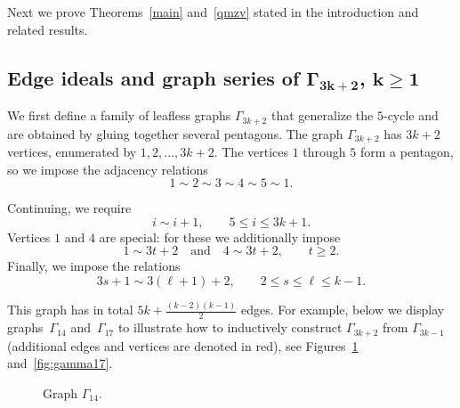 \documentclass[pdftex]{sigma}
\numberwithin{equation}{section}
\theoremstyle{definition}
\begin{document}
Next we prove Theorems~\ref{main} and~\ref{qmzv} stated in the introduction and related results.

\subsection[Edge ideals and graph series of Gamma\_\{3k+2\}, k>=1]{Edge ideals and graph series of $\boldsymbol{\Gamma_{3k+2}}$, $\boldsymbol{k \geq 1}$}\label{section2.2}

We first define a family of leafless graphs $\Gamma_{3k+2}$ that generalize the $5$-cycle and are obtained by gluing together several pentagons. The graph $\Gamma_{3k+2}$ has $3k+2$ vertices, enumerated by $1,2,\dots,3k+2$. The vertices $1$ through $5$ form a pentagon, so we impose the adjacency relations
\[
1 \sim 2 \sim 3 \sim 4 \sim 5 \sim 1.
\]

Continuing, we require
\[
i \sim i+1, \qquad 5 \leq i \leq 3k+1.
\]
Vertices $1$ and $4$ are special: for these we additionally impose
\[
1 \sim 3t+2 \quad \text{and} \quad 4 \sim 3t+2, \qquad t \geq 2.
\]
Finally, we impose the relations
\[
3s+1 \sim 3(\ell+1)+2, \qquad 2 \leq s \leq \ell \leq k-1.
\]

This graph has in total $5k+\frac{(k-2)(k-1)}{2}$ edges.
For example, below we display graphs~$\Gamma_{14}$ and~$\Gamma_{17}$ to illustrate how to inductively construct $\Gamma_{3k+2}$ from $\Gamma_{3k-1}$ (additional edges and vertices are denoted in red), see Figures~\ref{fig:gamma14} and~\ref{fig:gamma17}.

\begin{figure}[!ht]\centering\vspace{-4mm}
\vspace{-4mm}

\caption{Graph $\Gamma_{14}$.}\label{fig:gamma14}
\end{figure}
\end{document}
